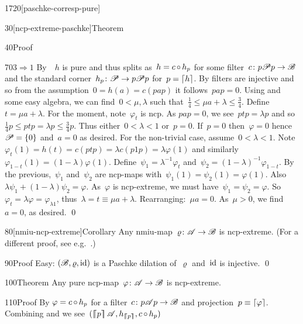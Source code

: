 \begin{parsec}{1720}[paschke-corresp-pure]
\begin{point}{30}[ncp-extreme-paschke]{Theorem}
\begin{point}{40}{Proof}
\begin{point}{70}{$3 \Rightarrow 1$}
By~~$h$ is pure
    and thus splits as~$h = c \mathop{\circ} h_p$
    for some filter~$c \colon p\mathscr{P} p \to \mathscr{B}$
    and the standard corner~$h_p\colon \mathscr{P} \to p\mathscr{P} p$
    for~$p = \left\lceil h\right\rceil$.
By  filters are injective
    and so from the assumption~$0 = h(a) = c(pap)$
    it follows~$pap = 0$.
Using  and some easy algebra,
    we can find~$0 < \mu,\lambda$
    such that~$\frac{1}{4} \leq \mu a + \lambda \leq \frac{3}{4}$.
Define~$t = \mu a + \lambda$.
For the moment, note~$\varphi_t$ is ncp.
As $pap = 0$, we see~$ptp = \lambda p$ and
so~$\frac{1}{4} p \leq  ptp = \lambda p
    \leq \frac{3}{4} p$.
Thus either~$0 < \lambda < 1$ or~$p = 0$.
If~$p = 0$ then~$\varphi=0$ hence~$\mathscr{P} = \{0\}$
    and~$a = 0$ as desired.
For the non-trivial case, assume~$0 < \lambda <1$.
Note~$\varphi_t(1) = h(t) = c(ptp) = \lambda c(p1p) = \lambda \varphi(1)$
    and similarly~$\varphi_{1-t}(1) = (1-\lambda) \varphi(1)$.
Define~$\psi_1 = \lambda^{-1} \varphi_t$
and~$\psi_2 = (1-\lambda)^{-1}\varphi_{1-t}$.
By the previous,~$\psi_1$ and~$\psi_2$ are ncp-maps
    with~$\psi_1(1)=\psi_2(1)=\varphi(1)$.
    Also~$\lambda \psi_1 + (1-\lambda) \psi_2 = \varphi$.
As~$\varphi$ is ncp-extreme,
    we must have~$\psi_1 = \psi_2 = \varphi$.
So~$\varphi_t = \lambda \varphi = \varphi_{\lambda 1}$,
    thus~$\lambda = t \equiv \mu a + \lambda$.
    Rearranging:~$\mu a = 0$.
    As~$\mu > 0$, we find~$a=0$, as desired. \qed
\end{point}
\end{point}
\end{point}
\begin{point}{80}[nmiu-ncp-extreme]{Corollary}%
Any nmiu-map~$\varrho\colon \mathscr{A} \to \mathscr{B}$ is ncp-extreme.
    (For a different proof, see e.g.~\cite[thm.~3.5]{stormer1963positive}.)
\begin{point}{90}{Proof}%
Easy: $(\mathscr{B}, \varrho, \mathrm{id})$ is a Paschke dilation of~$\varrho$
and~$\mathrm{id}$ is injective.  \qed
\end{point}
\end{point}
\begin{point}{100}{Theorem}%
Any pure ncp-map~$\varphi\colon \mathscr{A} \to \mathscr{B}$ is ncp-extreme.
\begin{point}{110}{Proof}%
By  $\varphi = c \mathop{\circ} h_p$
    for a filter~$c\colon p\mathscr{A} p \to \mathscr{B}$
    and projection~$p \equiv \left\lceil\varphi\right\rceil$.
    Combining  and 
    we see~$(\cceil{p}\scrA, h_{\cceil{p}}, c\after h_p)$

\end{point}
\end{point}
\end{parsec}
